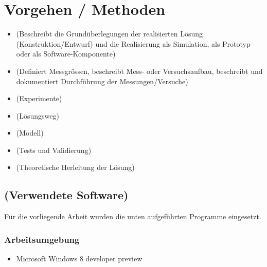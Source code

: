 %
%

\chapter{Vorgehen / Methoden}\label{chap.vorgehen}


\begin{itemize}
\item (Beschreibt die Grundüberlegungen der realisierten Lösung (Konstruktion/Entwurf) und die Realisierung als Simulation, als Prototyp oder als Software-Komponente)
\item (Definiert Messgrössen, beschreibt Mess- oder Versuchsaufbau, beschreibt und dokumentiert Durchführung der Messungen/Versuche)
\item (Experimente)
\item (Lösungsweg)
\item (Modell)
\item (Tests und Validierung)
\item (Theoretische Herleitung der Lösung)
\end{itemize}



\section{(Verwendete Software)}\label{software}
Für die vorliegende Arbeit wurden die unten aufgeführten Programme eingesetzt.

\subsection*{Arbeitsumgebung}\label{wintool}
\begin{itemize}
	\item Microsoft Windows 8 developer preview
\end{itemize}

